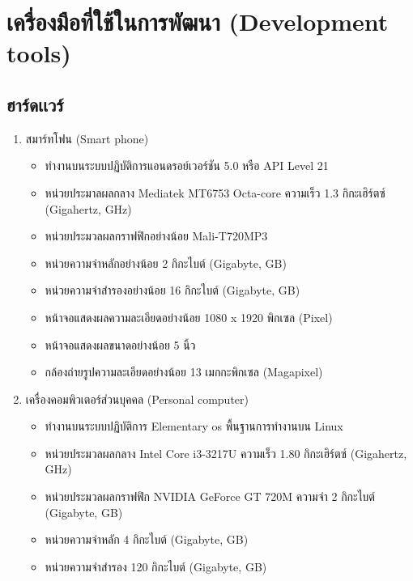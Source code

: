 \section{เครื่องมือที่ใช้ในการพัฒนา (Development tools)}
\subsection{ฮาร์ดเเวร์}
\begin{enumerate}
	\item สมาร์ทโฟน (Smart phone)
		\begin{itemize}
			\item ทำงานบนระบบปฏิบัติการแอนดรอย์เวอร์ชัน 5.0 หรือ API Level 21
			\item หน่วยประมาลผลกลาง Mediatek MT6753 Octa-core ความเร็ว 1.3 กิกะเฮิร์ตซ์ (Gigahertz, GHz)
			\item หน่วยประมวลผลกราฟฟิกอย่างน้อย Mali-T720MP3
			\item หน่วยความจำหลักอย่างน้อย 2 กิกะไบต์ (Gigabyte, GB)
			\item หน่วยความจำสำรองอย่างน้อย 16 กิกะไบต์ (Gigabyte, GB)
			\item หน้าจอแสดงผลความละเอียดอย่างน้อย 1080 x 1920 พิกเซล  (Pixel)
			\item หน้าจอแสดงผลขนาดอย่างน้อย 5 นิ้ว
			\item กล้องถ่ายรูปความละเอียดอย่างน้อย 13 เมกกะพิกเซล (Magapixel)
		\end{itemize}
	
	\item เครื่องคอมพิวเตอร์ส่วนบุคคล (Personal computer)
		\begin{itemize}
			\item  ทำงานบนระบบปฏิบัติการ Elementary os พื้นฐานการทำงานบน Linux
			\item  หน่วยประมวลผลกลาง Intel Core i3-3217U ความเร็ว 1.80 กิกะเฮิร์ตซ์ (Gigahertz, GHz)
			\item  หน่วยประมวลผลกราฟฟิก NVIDIA GeForce GT 720M ความจำ 2 กิกะไบต์ (Gigabyte, GB) 
			\item  หน่วยความจำหลัก 4 กิกะไบต์ (Gigabyte, GB)
			\item  หน่วยความจำสำรอง 120 กิกะไบต์ (Gigabyte, GB)
		\end{itemize}
\end{enumerate}


